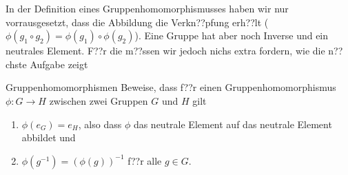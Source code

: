 \documentclass[a4paper,ngerman,12pt]{zirkelblatt1415}
\theoremstyle{definition}
\theoremstyle{plain}
\theoremstyle{remark}
\newcommand{\lra}{\longrightarrow}
\begin{document}

In der Definition eines Gruppenhomomorphismusses haben wir nur vorrausgesetzt, dass die Abbildung die Verkn??pfung erh??lt ($\phi(g_1\circ g_2)=\phi(g_1)\circ\phi(g_2)$). Eine Gruppe hat aber noch Inverse und ein neutrales Element. F??r die m??ssen wir jedoch nichs extra fordern, wie die n??chste Aufgabe zeigt

\begin{aufgabe}{Gruppenhomomorphismen}
  Beweise, dass f??r einen Gruppenhomomorphismus $\phi:G\lra H$ zwischen zwei Gruppen $G$ und $H$ gilt
  \begin{enumerate}
    \item $\phi(e_G)=e_H$, also dass $\phi$ das neutrale Element auf das neutrale Element abbildet und
    \item $\phi(g^{-1})=(\phi(g))^{-1}$ f??r alle $g\in G$.
  \end{enumerate}
\end{aufgabe}

\end{document}
